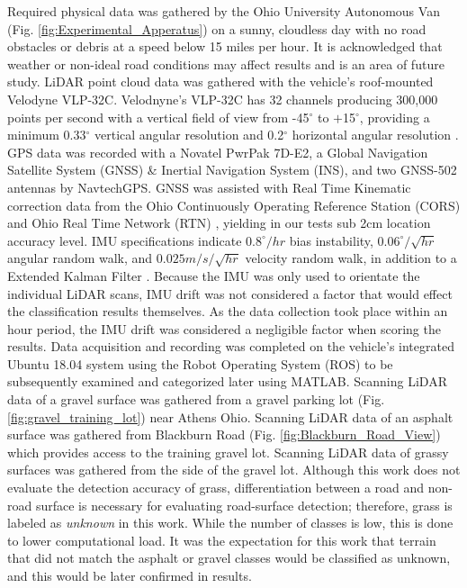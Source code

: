\documentclass[journal,onecolumn]{IEEEtran}
\begin{document}
			{Required physical data was gathered by the Ohio University Autonomous Van (Fig. \ref{fig:Experimental_Apperatus})  on a sunny, cloudless day with no road obstacles or debris at a speed below 15 miles per hour. It is acknowledged that weather or non-ideal road conditions may affect results and is an area of future study. LiDAR point cloud data was gathered with the vehicle's roof-mounted Velodyne VLP-32C. Velodnyne's VLP-32C has 32 channels producing 300,000 points per second with a vertical field of view from -45$^{\circ}$ to $+$15$^{\circ}$, providing a minimum 0.33$^{\circ}$ vertical angular resolution and 0.2$^{\circ}$ horizontal angular resolution \cite{vlp_32c}. GPS data was recorded with a Novatel PwrPak 7D-E2, a Global Navigation Satellite System (GNSS) \& Inertial Navigation System (INS), and two GNSS-502 antennas by NavtechGPS. GNSS was assisted with Real Time Kinematic correction data from the Ohio Continuously Operating Reference Station (CORS) and Ohio Real Time Network (RTN) \cite{noauthor_cors_nodate}, yielding in our tests sub 2cm location accuracy level. IMU specifications indicate $0.8 ^{\circ}/hr$ bias instability, $0.06 ^{\circ}/\sqrt{hr}$ angular random walk, and $0.025 m/s/\sqrt{hr}$ velocity random walk, in addition to a Extended Kalman Filter \cite{noauthor_pwrpak7_nodate}. Because the IMU was only used to orientate the individual LiDAR scans, IMU drift was not considered a factor that would effect the classification results themselves. As the data collection took place within an hour period, the IMU drift was considered a negligible factor when scoring the results. Data acquisition and recording was completed on the vehicle's integrated Ubuntu 18.04 system using the Robot Operating System (ROS) to be subsequently examined and categorized later using MATLAB. Scanning LiDAR data of a gravel surface was gathered from a gravel parking lot (Fig. \ref{fig:gravel_training_lot}) near Athens Ohio. Scanning LiDAR data of an asphalt surface was gathered from Blackburn Road (Fig. \ref{fig:Blackburn_Road_View}) which provides access to the training gravel lot. Scanning LiDAR data of grassy surfaces was gathered from the side of the gravel lot. Although this work does not evaluate the detection accuracy of grass, differentiation between a road and non-road surface is necessary for evaluating road-surface detection; therefore, grass is labeled as \textit{unknown} in this work. While the number of classes is low, this is done to lower computational load. It was the expectation for this work that terrain that did not match the asphalt or gravel classes would be classified as unknown, and this would be later confirmed in results.}
	
\end{document}
